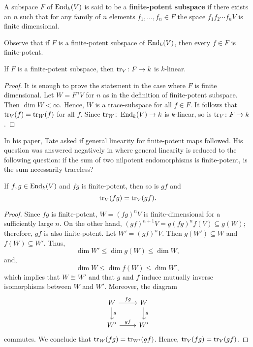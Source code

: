 \begin{definition}\label{def:finite-potent subspace}
	A subspace $F$ of $\operatorname{End}_{k}(V)$ is said to be a \textbf{finite-potent subspace} if there exists an $n$ such that for any family of $n$ elements $f_{1}, \ldots, f_{n}\in F$ the space $f_{1}f_{2}\cdots f_{n}V$ is finite dimensional.
\end{definition}
Observe that if $F$ is a finite-potent subspace of $\operatorname{End}_{k}(V)$, then every $f\in F$ is finite-potent. 
\begin{proposition}\label{prop:linearity-trace}
	If $F$ is a finite-potent subspace, then $\operatorname{tr}_{V}\colon F\to k$ is $k$-linear.
\end{proposition}
\begin{proof}
	It is enough to prove the statement in the case where $F$ is finite dimensional. Let $W = F^{n}V$ for $n$ as in the definition of finite-potent subspace. Then $\dim W < \infty$. Hence, $W$ is a trace-subspace for all $f\in F$. It follows that $\operatorname{tr}_{V}(f) = \operatorname{tr}_{W}(f)$ for all $f$. Since $\operatorname{tr}_{W}\colon \operatorname{End}_{k}(V) \to k$ is $k$-linear, so is $\operatorname{tr}_{V}\colon F \to k$.
\end{proof}
\begin{remark}\label{rem:general-linearity-trace}
	In his paper, Tate asked if general linearity for finite-potent maps followed. His question was answered negatively in \cite{TATE-TRACE-COUNTER-EXAMPLE} where general linearity is reduced to the following question: if the sum of two nilpotent endomorphisms is finite-potent, is the sum necessarily traceless?  
\end{remark}
\begin{proposition}\label{prop:trace-inavriant-under-commutator}
	If $f,g \in \operatorname{End}_{k}(V)$ and $fg$ is finite-potent, then so is $gf$ and 
	\[
		\operatorname{tr}_{V}(fg) = \operatorname{tr}_{V}(gf).
	\]
\end{proposition}
\begin{proof}
	Since $fg$ is finite-potent, $W =(fg)^{n}V$ is finite-dimensional for a sufficiently large $n$. On the other hand, $(gf)^{n+1}V= g(fg)^{n}f(V) \subseteq g(W)$; therefore, $gf$ is also finite-potent. Let $W' = (gf)^{n}V$. Then $g(W') \subseteq W$ and $f(W) \subseteq W'$. Thus, 
	\[
		\dim W' \leq \dim g(W) \leq \dim W,
	\]
	and, 
	\[
		\dim W \leq \dim f(W) \leq \dim W',
	\]
	which implies that $W\cong W'$ and that $g$ and $f$ induce mutually inverse isomorphisms between $W$ and $W'$. Moreover, the diagram
	\[
		\begin{tikzcd}
			W \arrow[r, "fg"]\arrow[d, "g"] & W \arrow[d, "g"] \\
			W' \arrow[r, "gf"] & W'
		\end{tikzcd}
	\]
	commutes. We conclude that $\operatorname{tr}_{W}(fg) = \operatorname{tr}_{W'}(gf)$. Hence, $\operatorname{tr}_{V}(fg) = \operatorname{tr}_{V}(gf)$.
\end{proof}
